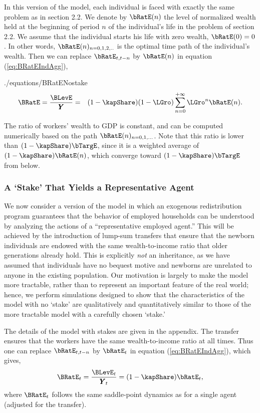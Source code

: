\documentclass[titlepage]{\econtex}\newcommand{\texname}{cjSOE}
\renewcommand{\GDPLev}{\ensuremath{\pmb{Y}}}
\begin{document}
In this version of the model, each individual is faced with exactly
the same problem as in section 2.2. We denote by $\bRatE(n)$ the level
of normalized wealth held at the beginning of period $n$ of the
individual's life in the problem of section 2.2. We assume that the
individual starts his life with zero wealth, $\bRatE(0)=0$. In other
words, $\bRatE(n)_{n=0,1,2,..}$ is the optimal time path of the
individual's wealth. Then we can replace $\bRatE_{t,t-n}$ by
$\bRatE(n)$ in equation (\ref{eq:BRatEIndAgg}),
\begin{verbatimwrite}{./equations/BRatENostake}
\begin{eqnarray}
\BRatE = \frac{\BLevE}{\GDPLev} & = & (1-\kapShare) (1-\LGro)\sum_{n=0}^{+\infty}\LGro^{n} \bRatE(n).
\label{eq:BRatENostake}
\end{eqnarray}
\end{verbatimwrite}

The ratio of workers' wealth to GDP is constant, and can be computed numerically based on the path $\bRatE(n)_{n=0,1,...}$. Note that this ratio is lower than $(1-\kapShare) \bTargE$, since it is a weighted average of $(1-\kapShare) \bRatE(n)$, which converge toward $(1-\kapShare) \bTargE$ from below.



\subsubsection{A `Stake' That Yields a Representative Agent}

We now consider a version of the model in which an exogenous
redistribution program guarantees that the behavior of employed
households can be understood by analyzing the actions of a
``representative employed agent.'' This will be achieved by the
introduction of lump-sum transfers that ensure that the newborn
individuals are endowed with the same wealth-to-income ratio that
older generations already hold. This is explicitly {\it not} an
inheritance, as we have assumed that individuals have no bequest
motive and newborns are unrelated to anyone in the existing
population.  Our motivation is largely to make the model more
tractable, rather than to represent an important feature of the real
world; hence, we perform simulations designed to show that the
characteristics of the model with no `stake' are qualitatively and
quantitatively similar to those of the more tractable model with a
carefully chosen `stake.'


The details of the model with stakes are given in the appendix. The transfer ensures that the workers have the same wealth-to-income ratio at all times. Thus one can replace $\bRatE_{t,t-n}$ by $\bRatE_t$ in equation (\ref{eq:BRatEIndAgg}), which gives,
\begin{equation}
\BRatE_{t} = \frac{\BLevE_t}{\GDPLev_t}= (1-\kapShare ) \bRatE_t,
\label{eq:BRatEStakest}
\end{equation}
where $\BRatE_t$ follows the same saddle-point dynamics as for a single agent (adjusted for the transfer).
\end{document}
